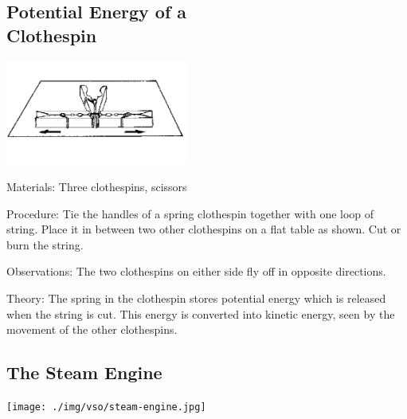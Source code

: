 \begin{multicols}{2}
\subsection[Potential Energy of a Clothespin]{Potential Energy of a \hfill \\ Clothespin}

\begin{center}
\includegraphics[width=0.45\textwidth]{./img/source/energy-clothespin.png}
\end{center}

\begin{description*}
\item[Materials:]{Three clothespins, scissors}
\item[Procedure:]{Tie the handles of a spring clothespin together with one loop of string. Place it in between two other clothespins on a flat table as shown. Cut or burn the string.}
\item[Observations:]{The two clothespins on either side fly off in opposite directions.}
\item[Theory:]{The spring in the clothespin stores potential energy which is released when the string is cut. This energy is converted into kinetic energy, seen by the movement of the other clothespins.}
\end{description*}

\subsection{The Steam Engine}

\begin{center}
\texttt{[image: ./img/vso/steam-engine.jpg]}
\end{center}


\end{multicols}
